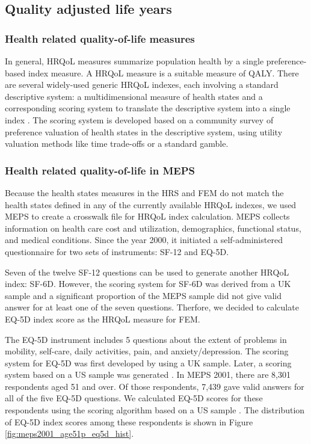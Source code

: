 \subsection{Quality adjusted life years}
\label{sec:model_development_qalys}

\subsubsection{Health related quality-of-life measures}
\label{sec:model_development_qalys_hrqol}
In general, HRQoL measures summarize population health by a single 
preference-based index measure. A HRQoL measure is a suitable measure of QALY. 
There are several widely-used generic HRQoL indexes, each involving a standard descriptive system: a 
multidimensional measure of health states and a corresponding scoring system to translate the descriptive 
system into a single index \citep{fryback2007us}. The scoring system is developed based on a community survey 
of preference valuation of health states in the descriptive system, using utility valuation methods like time 
trade-offs or a standard gamble. 

\subsubsection{Health related quality-of-life in MEPS}
\label{sec:model_development_qalys_eq5d}
Because the health states measures in the HRS and FEM do not match the health 
states defined in any of the currently available HRQoL indexes, we used MEPS to 
create a crosswalk file for HRQoL index calculation.  MEPS collects information 
on health care cost and utilization, demographics, functional status, and medical 
conditions. Since the year 2000, it initiated a self-administered questionnaire 
for two sets of instruments: SF-12 and EQ-5D. 

Seven of the twelve SF-12 questions can be used to generate another HRQoL index: 
SF-6D. However, the scoring system for SF-6D was derived from a UK sample 
\citep{brazier2004estimation} and a significant proportion of the MEPS sample 
did not give valid answer for at least one of the seven questions. Therfore, we 
decided to calculate EQ-5D index score as the HRQoL measure for FEM. 

The EQ-5D instrument includes 5 questions about the extent of problems in 
mobility, self-care, daily activities, pain, and anxiety/depression. The scoring 
system for EQ-5D was first developed by \citet{dolan1997modeling} using a UK 
sample. Later, a scoring system based on a US sample was generated 
\citep{shaw2005us}. In MEPS 2001, there are 8,301 respondents aged 51 and over. 
Of those respondents, 7,439 gave valid answers for all of the five EQ-5D 
questions. We calculated EQ-5D scores for these respondents using the scoring 
algorithm based on a US sample \citep{shaw2005us}. The distribution of EQ-5D 
index scores among these respondents is shown in Figure 
\ref{fig:meps2001_age51p_eq5d_hist}.

